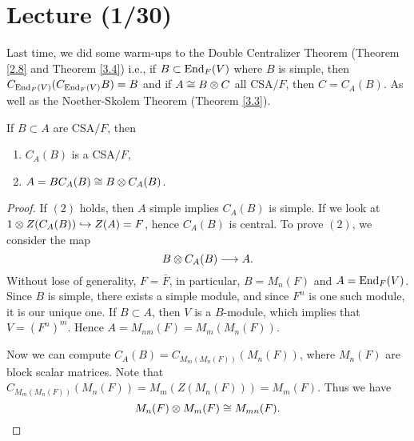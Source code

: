 \section{Lecture (1/30)}
Last time, we did some warm-ups to the  Double Centralizer Theorem (Theorem \ref{2.8} and Theorem \ref{3.4}) i.e., if $B \subset \operatorname{End}_F(V)$ where $B$ is simple, then $C_{\operatorname{End}_F(V)}(C_{\operatorname{End}_F(V)}B) = B$ and if $A \cong B\otimes C$ all CSA$/F$, then $C = C_A(B)$. As well as the Noether-Skolem Theorem (Theorem \ref{3.3}).

\begin{theorem}\label{4.1}
If $B \subset A$ are CSA$/F$, then
\begin{enumerate}
\item $C_A(B)$ is a CSA$/F$,
\item $A = B C_A(B) \cong B \otimes C_A(B)$.
\end{enumerate}
\end{theorem}
\begin{proof}
If $(2)$ holds, then $A$ simple implies $C_A(B)$ is simple. If we look at $1 \otimes Z(C_A(B)) \hookrightarrow Z(A) = F$, hence $C_A(B)$ is central. To prove $(2)$, we consider the map
$$B \otimes C_A(B) \longrightarrow A .$$
Without lose of generality, $F  = \bar{F}$, in particular, $B = M_n(F)$ and $A = \operatorname{End}_F(V)$. Since $B$ is simple, there exists a simple module, and since $F^n$ is one such module, it is our unique one. If $B \subset A$, then $V$ is a $B$-module, which implies that $V = (F^n)^m$. Hence $A = M_{nm}(F) = M_m(M_n(F)).$ 

Now we can compute $C_A(B) = C_{M_m(M_n(F))}(M_n(F))$, where $M_n(F)$ are block scalar matrices. Note that $C_{M_m(M_n(F))}(M_n(F)) = M_m(Z(M_n(F))) = M_m(F)$. Thus we have 
$$M_n(F) \otimes M_m(F) \cong M_{mn}(F).$$
\end{proof}

